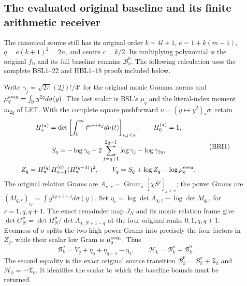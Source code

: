 \subsection{The evaluated original baseline and its finite arithmetic receiver}

The canonical source still has its original order $k=4l+1$,
$e=1+k(m-1)$, $q=e(k+1)^2=2n$, and centre $c=k/2$.
Its multiplying polynomial is the original $f_l$, and its full
baseline remains $\mathcal B_k^0$. The following calculation uses
the complete BSL1--22 and HBL1--18 proofs included below.

Write $\gamma_j=\sqrt{2\pi}(2j)!/4^j$ for the original monic
Gamma norms and $\mu_q^{\rm even}=\int_{\mathbb R}y^{2q}d\sigma(y)$.
This last scalar is BSL's $\mu_q$ and the literal-index moment
$m_{2q}$ of LET. With the complete square pushforward
$\nu=(y\mapsto y^2)_*\sigma$, retain
\[
\begin{gathered}
 H_s^{(a)}=\det\left[\int_0^\infty t^{a+i+j}d\nu(t)\right]_{i,j<s},
 \qquad H_0^{(a)}=1,\\
 S_q=-\log\gamma_q-2\sum_{j=q+1}^{2q-1}\log\gamma_j
                                             -\log\gamma_{2q},\\
 Z_q=H_n^{(q)}H_{n+1}^{(q)}(H_n^{(q+1)})^2,
 \qquad V_q=S_q+\log Z_q-\log\mu_q^{\rm even}.
\end{gathered}\tag{BRI1}
\]
The original relation Grams are
$A_{\chi,r}=\operatorname{Gram}_\sigma[\chi S^j]_{j<r}$;
the power Grams are
$(M_{q,r})_{ij}=\int y^{2q+i+j}d\sigma(y)$.
Set $\eta_r=\log\det A_{\chi,r}-\log\det M_{q,r}$ for
$r=1,q,q+1$. The exact remainder map $J_N$ and its monic
relation frame give $\det G_N^\sigma=\det H_N^\sigma/
\det A_{\chi,N+1-q}$ at the four original ranks $0,1,q,q+1$.
Evenness of $\sigma$ splits the two high power Grams into precisely
the four factors in $Z_q$, while their scalar low Gram is
$\mu_q^{\rm even}$. Thus
\[
 \mathcal B_k^\sigma=V_q+\eta_q+\eta_{q+1}-\eta_1,
 \qquad \mathcal H_k=\mathcal B_k^\sigma-\mathcal B_k^0.
 \tag{BRI2}
\]
The second equality is the exact original source transition
$\mathcal B_k^0=\mathcal B_k^\sigma+\mathfrak T_k$ and
$\mathcal H_k=-\mathfrak T_k$. It identifies the scalar to
which the baseline bounds must be returned.


